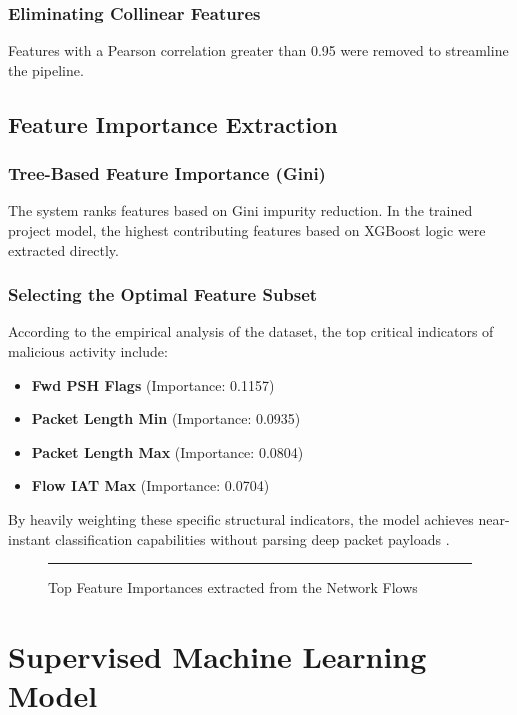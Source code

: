 \documentclass[12pt, a4paper]{report}
\begin{document}
\subsection{Eliminating Collinear Features}
Features with a Pearson correlation greater than 0.95 were removed to streamline the pipeline.

\section{Feature Importance Extraction}
\subsection{Tree-Based Feature Importance (Gini)}
The system ranks features based on Gini impurity reduction. In the trained project model, the highest contributing features based on XGBoost logic were extracted directly.
\subsection{Selecting the Optimal Feature Subset}
According to the empirical analysis of the dataset, the top critical indicators of malicious activity include:
\begin{itemize}
    \item \textbf{Fwd PSH Flags} (Importance: 0.1157)
    \item \textbf{Packet Length Min} (Importance: 0.0935)
    \item \textbf{Packet Length Max} (Importance: 0.0804)
    \item \textbf{Flow IAT Max} (Importance: 0.0704)
\end{itemize}
By heavily weighting these specific structural indicators, the model achieves near-instant classification capabilities without parsing deep packet payloads \cite{ref10}.

\begin{figure}[htbp]
    \centering
    \rule{0.8\textwidth}{6cm} 
    \caption{Top Feature Importances extracted from the Network Flows}
    \label{fig:feature_importance}
\end{figure}

\chapter{Supervised Machine Learning Model}
\end{document}
